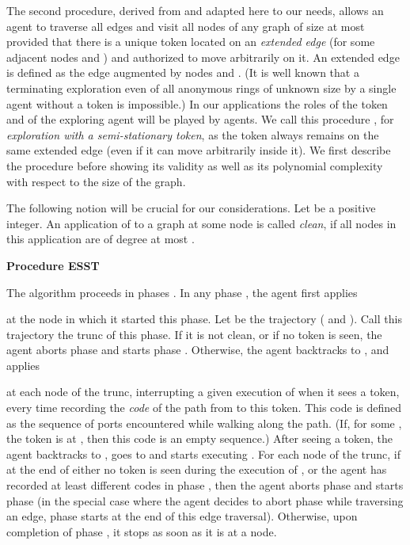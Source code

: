 \documentclass [11pt] {article}
\begin{document}
{The second procedure, derived from \cite{DP} and adapted here to our needs, allows an agent to traverse all edges {and visit all nodes} of any graph of size at most  provided that there is a {unique token located on an {\em extended edge}  (for some adjacent nodes  and ) and authorized to move arbitrarily on it.
An extended edge is defined as the edge  augmented by nodes  and }. (It is well known that a terminating exploration even of all anonymous rings of unknown size by a single agent without a token is impossible.) 
In our applications the roles of the token and of the exploring agent will be played by agents. We call this procedure , for {\em exploration with a semi-stationary token}, {as the token always remains on the same extended edge (even if it can move arbitrarily inside it)}. We first describe the procedure before showing its validity as well as its polynomial complexity with respect to the size of the graph.}


{
The following notion will be crucial for our considerations. Let  be a positive integer.  An application of  to a graph  at some node  is called {\em clean}, if all nodes in this application are of degree at most .}

\vspace*{0.2cm}
\noindent
{{\bf Procedure ESST}}

{The algorithm proceeds in {phases .} In any phase , the agent first applies 

at the node  in which it started this phase.
Let  be the trajectory  ( and ). Call this trajectory the trunc of this phase.
If it is not clean, or if no token is seen, the agent aborts phase  and starts phase {}. Otherwise, the agent backtracks to , and applies 

at each node  of the trunc, interrupting a given execution of  when it sees a token, every time recording the {\em code} of the path from  to this token. 
This code is defined as the sequence of ports
encountered while walking along the path.
(If, for some , the token is at , then this code is an empty sequence.) After seeing a token, the agent backtracks to , goes
to  and starts executing . For each node  of the trunc, if at the end of  either no token is seen during the execution of , or the agent has recorded at least {} different codes in phase , then
the agent aborts phase  and starts phase {} (in the special case where the agent decides to abort phase  while traversing an edge, phase {} starts at the end of this edge traversal). Otherwise, upon completion of phase , it stops as soon as it is at a node.}
\end{document}
